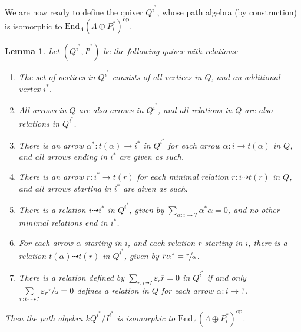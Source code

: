 \documentclass[12pt, dvipsnames, oneside]{amsart}
\newtheorem{lemma}[theorem]{Lemma}
\theoremstyle{definition}
\newcommand{\End}{\text{End}}
\begin{document}
\bigskip

We are now ready to define the quiver $Q^{i^*}$, whose path algebra (by construction) is isomorphic to $\End_\Lambda(\Lambda\oplus P_i^*)^{\text{op}}$.

\bigskip

\begin{lemma}\label{lemma:Qi*}
Let $(Q^{i^*}, I^{i^*})$ be the following quiver with relations:
\begin{enumerate}\addtocounter{enumi}{-1}
\item The set of vertices in $Q^{i^*}$ consists of all vertices in $Q$, and an additional vertex $i^*$.
\item All arrows in $Q$ are also arrows in $Q^{i^*}$, and all relations in $Q$ are also relations in $Q^{i^*}$.
\item There is an arrow $\alpha^*\colon t(\alpha)\rightarrow i^*$ in $Q^{i^*}$ for each arrow $\alpha\colon i\rightarrow t(\alpha)$ in $Q$, and all arrows ending in $i^*$ are given as such.
\item There is an arrow $\overline{r}\colon i^*\rightarrow t(r)$ for each minimal relation $r\colon i \dashrightarrow t(r)$ in $Q$, and all arrows starting in $i^*$ are given as such.
\item There is a relation $i\dashrightarrow i^*$ in $Q^{i^*}$, given by $\sum\limits_{\alpha:i\rightarrow ?}\alpha^*\alpha=0$, and no other minimal relations end in $i^*$.
\item For each arrow $\alpha$ starting in $i$, and each relation $r$ starting in $i$, there is a relation $t(\alpha)\dashrightarrow t(r)$ in $Q^{i^*}$, given by $\overline{r}\alpha^*=\sfrac{r}{\alpha}$.
\item There is a relation defined by $\sum\limits_{r:i\dashrightarrow ?} \varepsilon_r \overline{r}=0$ in $Q^{i^*}$ if and only $\sum\limits_{r:i\dashrightarrow ?} \varepsilon_r \sfrac{r}{\alpha}=0$ defines a relation in $Q$ for each arrow $\alpha\colon i\rightarrow ?$.
\end{enumerate}
Then the path algebra $kQ^{i^*}/I^{i^*}$ is isomorphic to $\End_\Lambda(\Lambda\oplus P_i^*)^{\text{op}}$.
\end{lemma}
\end{document}
